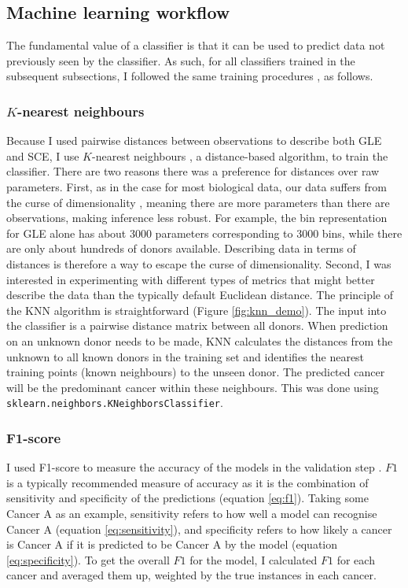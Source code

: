 \subsection{Machine learning workflow}\label{methods:ml_workflow}
The fundamental value of a classifier is that it can be used to predict data not previously seen by the classifier. As such, for all classifiers trained in the subsequent subsections, I followed the same training procedures \citep{Zengyou2015DataApplications}, as follows. 

\subsubsection{$K$-nearest neighbours}
Because I used pairwise distances between observations to describe both GLE and SCE, I use $K$-nearest neighbours \citep[KNN;][]{Neath2010DiscriminationClassification}, a distance-based algorithm, to train the classifier. There are two reasons there was a preference for distances over raw parameters. First, as in the case for most biological data, our data suffers from the curse of dimensionality \citep{Banks2003DataStatistics}, meaning there are more parameters than there are observations, making inference less robust. For example, the bin representation for GLE alone has about 3000 parameters corresponding to 3000 bins, while there are only about hundreds of donors available. Describing data in terms of distances is therefore a way to escape the curse of dimensionality. Second, I was interested in experimenting with different types of metrics that might better describe the data than the typically default Euclidean distance. The principle of the KNN algorithm is straightforward (Figure \ref{fig:knn_demo}). The input into the classifier is a pairwise distance matrix between all donors. When prediction on an unknown donor needs to be made, KNN calculates the distances from the unknown to all known donors in the training set and identifies the nearest training points (known neighbours) to the unseen donor. The predicted cancer will be the predominant cancer within these neighbours. This was done using \texttt{sklearn.neighbors.KNeighborsClassifier}.



\newpage
\subsubsection{F1-score}
I used F1-score to measure the accuracy of the models in the validation step \citep{Kulkarni2020FoundationsDemocracy}. $F1$ is a typically recommended measure of accuracy as it is the combination of sensitivity and specificity of the predictions (equation \ref{eq:f1}). Taking some Cancer A as an example, sensitivity refers to how well a model can recognise Cancer A (equation \ref{eq:sensitivity}), and specificity refers to how likely a cancer is Cancer A if it is predicted to be Cancer A by the model (equation \ref{eq:specificity}). To get the overall $F1$ for the model, I calculated $F1$ for each cancer and averaged them up, weighted by the true instances in each cancer.

